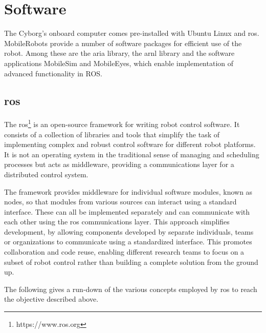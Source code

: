 \documentclass[\rootfolder/main.tex]{subfiles}
\begin{document}

\section{Software}

The Cyborg's onboard computer comes pre-installed with Ubuntu Linux and \acrshort{ros}.
MobileRobots provide a number of software packages for efficient use of the robot. 
Among these are the \acrfull{aria} library, the \acrfull{arnl} library and the software applications MobileSim and MobileEyes, which enable implementation of advanced functionality in ROS.


\subsection{\acrfull{ros}}

The \acrfull{ros}\footnote{https://www.ros.org} is an open-source framework for writing robot control software.
It consists of a collection of libraries and tools that simplify the task of implementing complex and robust control software for different robot platforms.
It is not an operating system in the traditional sense of managing and scheduling processes but acts as middleware, providing a communications layer for a distributed control system.

The framework provides middleware for individual software modules, known as nodes, so that modules from various sources can interact using a standard interface.
These can all be implemented separately and can communicate with each other using the \acrshort{ros} communications layer.
This approach simplifies development, by allowing components developed by separate individuals, teams or organizations to communicate using a standardized interface.
This promotes collaboration and code reuse, enabling different research teams to focus on a subset of robot control rather than building a complete solution from the ground up.

The following gives a run-down of the various concepts employed by \acrshort{ros} to reach the objective described above.
\end{document}
